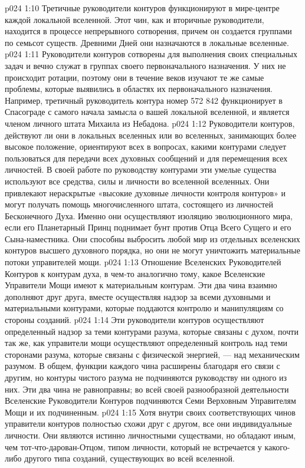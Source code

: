 \vs p024 1:10 Третичные руководители контуров функционируют в мире\hyp{}центре каждой локальной вселенной. Этот чин, как и вторичные руководители, находится в процессе непрерывного сотворения, причем он создается группами по семьсот существ. Древними Дней они назначаются в локальные вселенные.
\vs p024 1:11 Руководители контуров сотворены для выполнения своих специальных задач и вечно служат в группах своего первоначального назначения. У них не происходит ротации, поэтому они в течение веков изучают те же самые проблемы, которые выявились в областях их первоначального назначения. Например, третичный руководитель контура номер 572 842 функционирует в Спасограде с самого начала замысла о вашей локальной вселенной, и является членом личного штата Михаила из Небадона.
\vs p024 1:12 \pc Руководители контуров, действуют ли они в локальных вселенных или во вселенных, занимающих более высокое положение, ориентируют всех в вопросах, какими контурами следует пользоваться для передачи всех духовных сообщений и для перемещения всех личностей. В своей работе по руководству контурами эти умелые существа используют все средства, силы и личности во вселенной вселенных. Они привлекают нераскрытые «высокие духовные личности контроля контуров» и могут получать помощь многочисленного штата, состоящего из личностей Бесконечного Духа. Именно они осуществляют изоляцию эволюционного мира, если его Планетарный Принц поднимает бунт против Отца Всего Сущего и его Сына\hyp{}наместника. Они способны выбросить любой мир из отдельных вселенских контуров высшего духовного порядка, но они не могут уничтожить материальные потоки управителей мощи.
\vs p024 1:13 \pc Отношение Вселенских Руководителей Контуров к контурам духа, в чем\hyp{}то аналогично тому, какое Вселенские Управители Мощи имеют к материальным контурам. Эти два чина взаимно дополняют друг друга, вместе осуществляя надзор за всеми духовными и материальными контурами, которые поддаются контролю и манипуляциям со стороны созданий.
\vs p024 1:14 Эти руководители контуров осуществляют определенный надзор за теми контурами разума, которые связаны с духом, почти так же, как управители мощи осуществляют определенный контроль над теми сторонами разума, которые связаны с физической энергией, --- над механическим разумом. В общем, функции каждого чина расширены благодаря его связи с другим, но контуры чистого разума не подчиняются руководству ни одного из них. Эти два чина не равноправны; во всей своей разнообразной деятельности Вселенские Руководители Контуров подчиняются Семи Верховным Управителям Мощи и их подчиненным.
\vs p024 1:15 \pc Хотя внутри своих соответствующих чинов управители контуров полностью схожи друг с другом, все они индивидуальные личности. Они являются истинно личностными существами, но обладают иным, чем тот\hyp{}что\hyp{}дарован\hyp{}Отцом, типом личности, который не встречается у какого\hyp{}либо другого типа созданий, существующих во всей вселенной.
